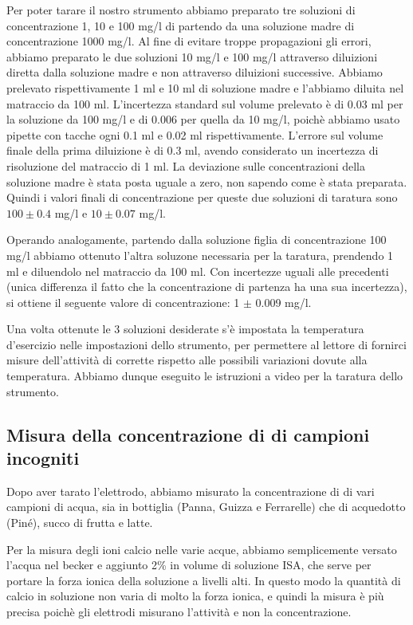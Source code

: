 Per poter tarare il nostro strumento abbiamo preparato tre soluzioni di concentrazione 1, 10 e 100 mg/l
di  partendo da una soluzione madre di concentrazione 1000 mg/l. 
Al fine di evitare troppe propagazioni gli errori, abbiamo preparato le due soluzioni 10 mg/l e 100 mg/l
attraverso diluizioni diretta dalla soluzione madre e non attraverso diluizioni successive.
Abbiamo prelevato rispettivamente 1 ml e 10 ml di soluzione madre e l'abbiamo diluita nel matraccio da 100 ml.
L'incertezza standard sul volume prelevato è di 0.03 ml per la soluzione da 100 mg/l e di 0.006 per quella da 10 mg/l,
poichè abbiamo usato pipette con tacche ogni 0.1 ml e 0.02 ml rispettivamente.
L'errore sul volume finale della prima diluizione è di 0.3 ml,
avendo considerato un incertezza di risoluzione del matraccio di 1 ml.
La deviazione sulle concentrazioni della soluzione madre è stata posta uguale a zero, non sapendo come è
stata preparata. Quindi i valori finali di concentrazione per queste due soluzioni di taratura sono
$100 \pm 0.4$ mg/l e $10 \pm 0.07$ mg/l.

Operando analogamente, partendo dalla soluzione figlia di concentrazione 100 mg/l abbiamo ottenuto l'altra soluzone
necessaria per la taratura, prendendo 1 ml e diluendolo nel matraccio da 100 ml. Con incertezze uguali alle precedenti (unica differenza il fatto che la concentrazione di partenza ha una sua incertezza), si ottiene il seguente
valore di concentrazione: 1 $\pm$ 0.009 mg/l.

Una volta ottenute le 3 soluzioni desiderate s'è impostata la temperatura d'esercizio nelle impostazioni
dello strumento, per permettere al lettore di fornirci misure dell'attività di 
corrette rispetto alle possibili variazioni dovute alla temperatura. Abbiamo dunque eseguito le istruzioni a video
per la taratura dello strumento.

\subsection*{Misura della concentrazione di  di campioni incogniti}

Dopo aver tarato l'elettrodo, abbiamo misurato la concentrazione di  di vari campioni di acqua,
sia in bottiglia (Panna, Guizza e Ferrarelle) che di acquedotto (Piné), succo di frutta e latte.

Per la misura degli ioni calcio nelle varie acque, abbiamo semplicemente versato l'acqua nel becker
e aggiunto 2\% in volume di soluzione ISA, che serve per portare la forza ionica della soluzione
a livelli alti. In questo modo la quantità di calcio in soluzione non varia di molto la forza ionica,
e quindi la misura è più precisa poichè gli elettrodi misurano l'attività e non la concentrazione.

